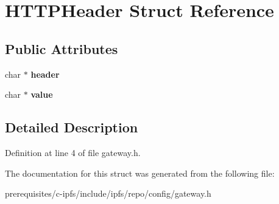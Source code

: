 \hypertarget{struct_h_t_t_p_header}{}\section{H\+T\+T\+P\+Header Struct Reference}
\label{struct_h_t_t_p_header}
\subsection*{Public Attributes}
\begin{DoxyCompactItemize}
\item 
\mbox{\label{struct_h_t_t_p_header_a1ef111a18f6ac9a1e71828d38c1eeefc}} 
char $\ast$ {\bfseries header}
\item 
\mbox{\label{struct_h_t_t_p_header_a0fcc7f40183ae3bd7f85e05c520ae70d}} 
char $\ast$ {\bfseries value}
\end{DoxyCompactItemize}


\subsection{Detailed Description}


Definition at line 4 of file gateway.\+h.



The documentation for this struct was generated from the following file\+:\begin{DoxyCompactItemize}
\item 
prerequisites/c-\/ipfs/include/ipfs/repo/config/gateway.\+h\end{DoxyCompactItemize}

